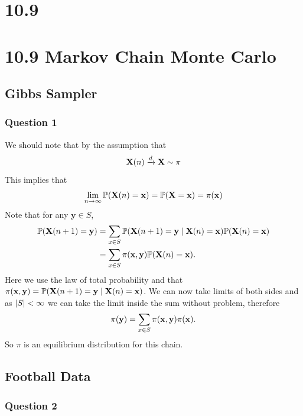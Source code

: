 \documentclass[11pt]{article} %
\let\originalleft\left
\let\originalright\right
\renewcommand{\left}{\mathopen{}\mathclose\bgroup\originalleft}
\renewcommand{\right}{\aftergroup\egroup\originalright}
\begin{document}
\section*{10.9}
\vspace*{6cm}

\section*{10.9 Markov Chain Monte Carlo}

\subsection*{Gibbs Sampler}

\subsubsection*{Question 1}
We should note that by the assumption that
$$ \mathbf{X}\left(n\right) \xrightarrow{d} \mathbf{X} \sim \pi  $$
This implies that
$$ \lim_{n \to \infty}{\mathbb{P}\left(\mathbf{X}\left(n\right) = \mathbf{x}\right)} = \mathbb{P}\left(\mathbf{X} = \mathbf{x}\right) = \pi\left(\mathbf{x}\right) $$
Note that for any $\mathbf{y} \in S$,
 \begin{align*}
 	\mathbb{P}\left(\mathbf{X}\left(n+1\right) = \mathbf{y}\right) & = \sum_{x \in S}{\mathbb{P}\left(\mathbf{X}\left(n+1\right) = \mathbf{y} \mid \mathbf{X}\left(n\right) = \mathbf{x}\right)\mathbb{P}\left(\mathbf{X}\left(n\right) = \mathbf{x}\right)} \\
 	& = \sum_{x \in S}{\pi\left(\mathbf{x}, \mathbf{y}\right)\mathbb{P}\left(\mathbf{X}\left(n\right) = \mathbf{x}\right)}.
 \end{align*}
Here we use the law of total probability and that $\pi\left(\mathbf{x}, \mathbf{y}\right) = \mathbb{P}\left(\mathbf{X}\left(n+1\right) = \mathbf{y} \mid\mathbf{X}\left(n\right) = \mathbf{x}\right)$. We can now take limits of both sides and as $\left|S\right|<\infty$ we can take the limit inside the sum without problem, therefore
 $$ \pi\left(\mathbf{y}\right) = \sum_{x \in S}{\pi\left(\mathbf{x}, \mathbf{y}\right)\pi\left(\mathbf{x}\right)} .$$
So $\pi$ is an equilibrium distribution for this chain.

\subsection*{Football Data}

\subsubsection*{Question 2}
\end{document}
